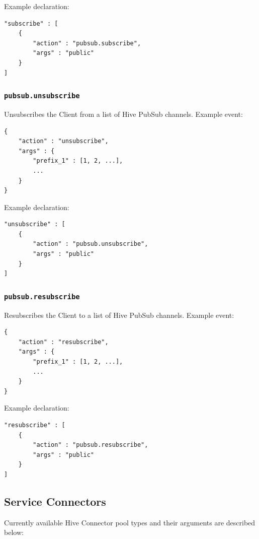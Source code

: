 \documentclass[a4paper]{article}
\begin{document}
\noindent
Example declaration:

\begin{verbatim}
"subscribe" : [
    {
        "action" : "pubsub.subscribe",
        "args" : "public"
    }
]
\end{verbatim}
\subsubsection{\texttt{pubsub.unsubscribe}}
\label{sec-9-3-13}

Unsubscribes the Client from a list of Hive PubSub channels. Example event:


\begin{verbatim}
{
    "action" : "unsubscribe",
    "args" : {
        "prefix_1" : [1, 2, ...],
        ...
    }
}
\end{verbatim}




\noindent
Example declaration:

\begin{verbatim}
"unsubscribe" : [
    {
        "action" : "pubsub.unsubscribe",
        "args" : "public"
    }
]
\end{verbatim}
\subsubsection{\texttt{pubsub.resubscribe}}
\label{sec-9-3-14}

Resubscribes the Client to a list of Hive PubSub channels. Example event:


\begin{verbatim}
{
    "action" : "resubscribe",
    "args" : {
        "prefix_1" : [1, 2, ...],
        ...
    }
}
\end{verbatim}




\noindent
Example declaration:

\begin{verbatim}
"resubscribe" : [
    {
        "action" : "pubsub.resubscribe",
        "args" : "public"
    }
]
\end{verbatim}
\subsection{Service Connectors}
\label{sec-9-4}
\label{ref-connectors}

Currently available Hive Connector pool types and their arguments are described below:
\end{document}
